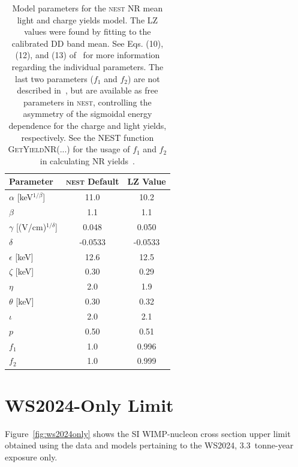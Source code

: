 \begin{table}[h!]
    \centering
    \caption{Model parameters for the \textsc{nest} NR mean light and charge yields model. The LZ values were found by fitting to the calibrated DD band mean. See Eqs. (10), (12), and (13) of~\cite{szydagis2022review} for more information regarding the individual parameters. The last two parameters ($f_1$ and $f_2$) are not described in~\cite{szydagis2022review}, but are available as free parameters in \textsc{nest}, controlling the asymmetry of the sigmoidal energy dependence for the charge and light yields, respectively. See the \textsc{NEST} function \textsc{GetYieldNR(...)} for the usage of $f_1$ and $f_2$ in calculating NR yields~\cite{nest_2_4_0}. \\}
    \begin{tabular}{l c c}
    \hline
    \hline
    Parameter & \textsc{nest} Default & LZ Value \\
    \hline
    $\alpha$ [keV$^{1/\beta}$] & 11.0 & 10.2 \\
    $\beta$ & 1.1 & 1.1 \\
    $\gamma$ [(V/cm)$^{1/\delta}$] & 0.048 & 0.050 \\
    $\delta$ & -0.0533 & -0.0533 \\
    $\epsilon$ [keV] & 12.6 & 12.5 \\
    $\zeta$ [keV] & 0.30 & 0.29 \\
    $\eta$ & 2.0 & 1.9 \\
    $\theta$ [keV] & 0.30 & 0.32 \\
    $\iota$ & 2.0 & 2.1 \\
    $p$ & 0.50 & 0.51 \\
    \hline
    $f_1$ & 1.0 & 0.996 \\ 
    $f_2$ & 1.0 & 0.999 \\
    \hline
    \hline
    \end{tabular}
    
    \label{nest_NR_params}
\end{table}

\section{WS2024-Only Limit}
Figure~\ref{fig:ws2024only} shows the SI WIMP-nucleon cross section upper limit obtained using the data and models pertaining to the WS2024, 3.3~tonne-year exposure only.


